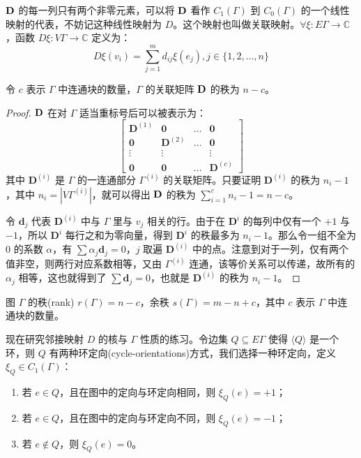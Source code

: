 $\textbf D$ 的每一列只有两个非零元素，可以将 $\textbf D$ 看作 $C_1(\Gamma)$ 到 $C_0(\Gamma)$ 的一个线性映射的代表，不妨记这种线性映射为 $D$。这个映射也叫做关联映射。$\forall \xi: E\Gamma\to \mathbb C$，函数 $D\xi: V\Gamma\to \mathbb C$ 定义为：
\[
D\xi(v_i) = \sum_{j = 1}^m d_{ij}\xi(e_j), j\in\{1,2,\dots,n\}
\]

\begin{proposition}[关联矩阵的秩]
令 $c$ 表示 $\Gamma$ 中连通块的数量，$\Gamma$ 的关联矩阵 $\textbf D$ 的秩为 $n - c$。
\end{proposition}
\begin{proof}
$\textbf D$ 在对 $\Gamma$ 适当重标号后可以被表示为：
\[
\left[\begin{array}{cccc}
\mathbf{D}^{(1)} & \mathbf{0} & \ldots & \mathbf{0} \\
\mathbf{0} & \mathbf{D}^{(2)} & \ldots & \mathbf{0} \\
\vdots & \vdots & & \vdots \\
\mathbf{0} & \mathbf{0} & \ldots & \mathbf{D}^{(c)}
\end{array}\right]
\]
其中 $\mathbf{D}^{(i)}$ 是 $\Gamma$ 的一连通部分 $\Gamma^{(i)}$ 的关联矩阵。只要证明 $\mathbf D^{(i)}$ 的秩为 $n_i - 1$，其中 $n_i = |V\Gamma^{(i)}|$，就可以得出 $\textbf D$ 的秩为 $\sum_{i = 1}^c n_i - 1 = n - c$。

令 $\mathbf d_j$ 代表 $\mathbf D^{(i)}$ 中与 $\Gamma$ 里与 $v_j$ 相关的行。由于在 $\mathbf D^{i}$ 的每列中仅有一个 $+1$ 与 $-1$，所以 $\mathbf D^{i}$ 每行之和为零向量，得到 $\mathbf D^{i}$ 的秩最多为 $n_i - 1$。那么令一组不全为 $0$ 的系数 ${\alpha}$，有 $\sum \alpha_j \mathbf d_j = 0$，$j$ 取遍 $\mathbf D^{(i)}$ 中的点。注意到对于一列，仅有两个值非空，则两行对应系数相等，又由 $\Gamma^{(i)}$ 连通，该等价关系可以传递，故所有的 $\alpha_j$ 相等，这也就得到了 $\sum \mathbf d_j = 0$，也就是 $\mathbf{D}^{(i)}$ 的秩为 $n_i - 1$。
\end{proof}

\begin{definition}[图的秩]
图 $\Gamma$ 的秩(rank) $r(\Gamma) = n - c$，余秩 $s(\Gamma) = m - n + c$，其中 $c$ 表示 $\Gamma$ 中连通块的数量。
\end{definition}

现在研究邻接映射 $D$ 的核与 $\Gamma$ 性质的练习。令边集 $Q\subseteq E\Gamma$ 使得 $\langle Q\rangle$ 是一个环，则 $Q$ 有两种环定向(cycle-orientations)方式，我们选择一种环定向，定义 $\xi_Q \in C_1(\Gamma)$：
\begin{enumerate}
\item 若 $e\in Q$，且在图中的定向与环定向相同，则 $\xi_Q(e) = +1$；
\item 若 $e\in Q$，且在图中的定向与环定向不同，则 $\xi_Q(e) = -1$；
\item 若 $e\notin Q$，则 $\xi_Q(e) = 0$。
\end{enumerate}


